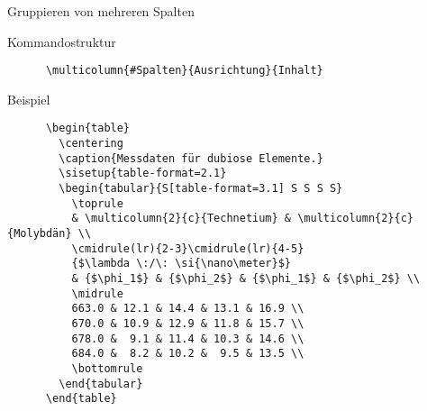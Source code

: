 \begin{frame}[fragile]{Gruppieren von mehreren Spalten}
  \begin{block}{Kommandostruktur}
    \begin{lstlisting}
      \multicolumn{#Spalten}{Ausrichtung}{Inhalt}
    \end{lstlisting}
  \end{block}
  \fontsize{8}{6}
  \begin{block}{Beispiel}
    \begin{lstlisting}
      \begin{table}
        \centering
        \caption{Messdaten für dubiose Elemente.}
        \sisetup{table-format=2.1}
        \begin{tabular}{S[table-format=3.1] S S S S}
          \toprule
          & \multicolumn{2}{c}{Technetium} & \multicolumn{2}{c}{Molybdän} \\
          \cmidrule(lr){2-3}\cmidrule(lr){4-5} 
          {$\lambda \:/\: \si{\nano\meter}$}
          & {$\phi_1$} & {$\phi_2$} & {$\phi_1$} & {$\phi_2$} \\
          \midrule
          663.0 & 12.1 & 14.4 & 13.1 & 16.9 \\
          670.0 & 10.9 & 12.9 & 11.8 & 15.7 \\
          678.0 &  9.1 & 11.4 & 10.3 & 14.6 \\
          684.0 &  8.2 & 10.2 &  9.5 & 13.5 \\
          \bottomrule
        \end{tabular}
      \end{table}
    \end{lstlisting}
  \end{block}
\end{frame}

